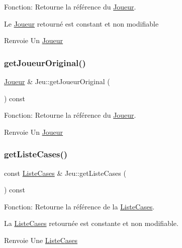 Fonction\+: Retourne la référence du \mbox{\hyperlink{classJoueur}{Joueur}}. 

Le \mbox{\hyperlink{classJoueur}{Joueur}} retourné est constant et non modifiable \begin{DoxyReturn}{Renvoie}
Un \mbox{\hyperlink{classJoueur}{Joueur}} 
\end{DoxyReturn}
\mbox{\label{classJeu_a22122d0bdd43f02109ef25d6874686c8}} 
\subsubsection{\texorpdfstring{get\+Joueur\+Original()}{getJoueurOriginal()}}
{\footnotesize\ttfamily \mbox{\hyperlink{classJoueur}{Joueur}} \& Jeu\+::get\+Joueur\+Original (\begin{DoxyParamCaption}{ }\end{DoxyParamCaption}) const}



Fonction\+: Retourne la référence du \mbox{\hyperlink{classJoueur}{Joueur}}. 

\begin{DoxyReturn}{Renvoie}
Un \mbox{\hyperlink{classJoueur}{Joueur}} 
\end{DoxyReturn}
\mbox{\label{classJeu_a9682a359e29f9f60e73ea05c36712b46}} 
\subsubsection{\texorpdfstring{get\+Liste\+Cases()}{getListeCases()}}
{\footnotesize\ttfamily const \mbox{\hyperlink{structListeCases}{Liste\+Cases}} \& Jeu\+::get\+Liste\+Cases (\begin{DoxyParamCaption}{ }\end{DoxyParamCaption}) const}



Fonction\+: Retourne la référence de la \mbox{\hyperlink{structListeCases}{Liste\+Cases}}. 

La \mbox{\hyperlink{structListeCases}{Liste\+Cases}} retournée est constante et non modifiable. \begin{DoxyReturn}{Renvoie}
Une \mbox{\hyperlink{structListeCases}{Liste\+Cases}} 
\end{DoxyReturn}
\mbox{\label{classJeu_ac7917f690a8dd29b9af1278a907edbfb}} 
